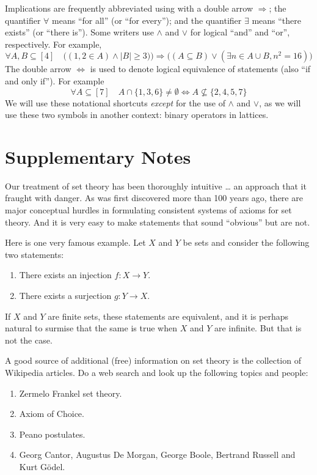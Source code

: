 Implications are frequently abbreviated using with
a double arrow $\Longrightarrow$; the quantifier $\forall$ means ``for all'' 
(or ``for every''); and the quantifier $\exists$ means 
``there exists'' (or ``there is'').  Some
writers use $\wedge$ and $\vee$ for logical ``and'' and
``or'', respectively.  For example, 
\[
\forall A,B\subseteq[4]\quad \bigl((1,2\in A) \wedge |B|\ge 3)\bigr)
\Longrightarrow\bigl((A\subseteq B)\vee (\exists n\in A\cup B, 
 n^2=16)\bigr)
\]
The double arrow $\iff$ is used to denote logical equivalence
of statements (also ``if and only if'').  For example
\[
\forall A\subseteq[7]\quad A\cap\{1,3,6\}\neq\emptyset\iff
A\nsubseteq\{2,4,5,7\}
\]
We will use these notational shortcuts \textit{except} for
the use of $\wedge$ and $\vee$, as we will use these two symbols
in another context: binary operators in lattices. 

\section{Supplementary Notes}

Our treatment of set theory has been thoroughly intuitive \dots
an approach that it fraught with danger.  As was first discovered
more than 100 years ago, there are major conceptual hurdles
in formulating consistent systems of axioms for set theory.
And it is very easy to make statements that sound ``obvious''
but are not.

Here is one very famous example.  Let $X$ and $Y$ be
sets and consider the following two
statements:

\begin{enumerate}
\item There exists an injection $f:X\rightarrow Y$.
\item There exists a surjection $g:Y\rightarrow X$.
\end{enumerate}
If $X$ and $Y$ are finite sets, these statements are
equivalent, and it is perhaps natural to surmise that the
same is true when $X$ and $Y$ are infinite.  But that is not
the case.

A good source of additional (free) information on set theory is
the collection of Wikipedia articles.  Do a web search and
look up the following topics and people:

\begin{enumerate}
\item Zermelo Frankel set theory.
\item Axiom of Choice.
\item Peano postulates.
\item Georg Cantor, Augustus De Morgan, George Boole, Bertrand Russell
and Kurt G\"odel.
\end{enumerate}

